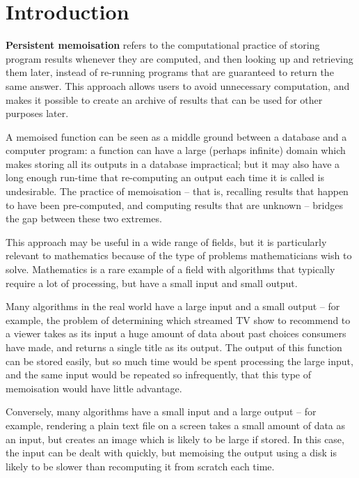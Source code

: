 \documentclass{deliverablereport}
\author{Michael Torpey}
\begin{document}
\maketitle
\githubissuedescription
\clearpage



\section{Introduction}
\label{sec:intro}

\textbf{Persistent memoisation} refers to the computational practice of storing
program results whenever they are computed, and then looking up and retrieving
them later, instead of re-running programs that are guaranteed to return the
same answer.  This approach allows users to avoid unnecessary computation, and
makes it possible to create an archive of results that can be used for other
purposes later.

A memoised function can be seen as a middle ground between a database and a
computer program: a function can have a large (perhaps infinite) domain which
makes storing all its outputs in a database impractical; but it may also have a
long enough run-time that re-computing an output each time it is called is
undesirable.  The practice of memoisation -- that is, recalling results that
happen to have been pre-computed, and computing results that are unknown --
bridges the gap between these two extremes.

This approach may be useful in a wide range of fields, but it is particularly
relevant to mathematics because of the type of problems mathematicians wish to
solve.  Mathematics is a rare example of a field with algorithms that typically
require a lot of processing, but have a small input and small output.

Many algorithms in the real world have a large input and a small output -- for
example, the problem of determining which streamed TV show to recommend to a
viewer takes as its input a huge amount of data about past choices consumers
have made, and returns a single title as its output.  The output of this
function can be stored easily, but so much time would be spent processing the
large input, and the same input would be repeated so infrequently, that this
type of memoisation would have little advantage.

Conversely, many algorithms have a small input and a large output -- for
example, rendering a plain text file on a screen takes a small amount of data as
an input, but creates an image which is likely to be large if stored.  In this
case, the input can be dealt with quickly, but memoising the output using a disk
is likely to be slower than recomputing it from scratch each time.
\end{document}
